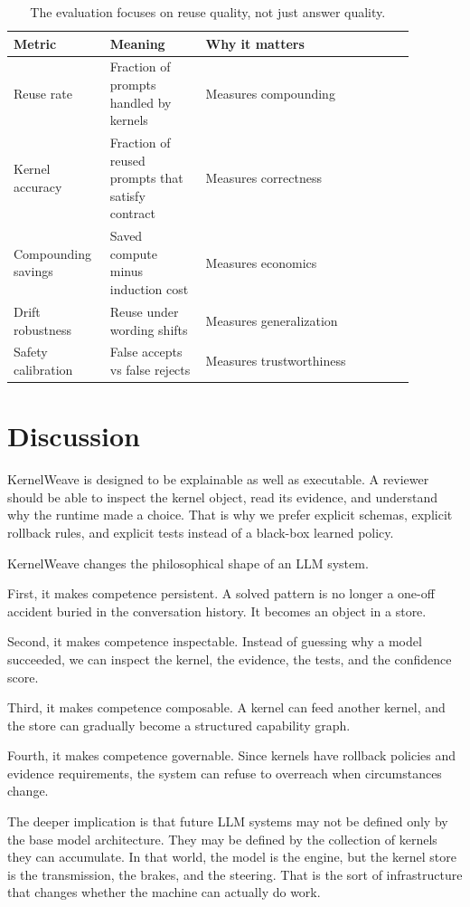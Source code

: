 \documentclass{article}
\begin{document}
\begin{table}[h]
\centering
\begin{tabular}{p{0.18\linewidth} p{0.22\linewidth} p{0.48\linewidth}}
\toprule
Metric & Meaning & Why it matters \\
\midrule
Reuse rate & Fraction of prompts handled by kernels & Measures compounding \\
Kernel accuracy & Fraction of reused prompts that satisfy contract & Measures correctness \\
Compounding savings & Saved compute minus induction cost & Measures economics \\
Drift robustness & Reuse under wording shifts & Measures generalization \\
Safety calibration & False accepts vs false rejects & Measures trustworthiness \\
\bottomrule
\end{tabular}
\caption{The evaluation focuses on reuse quality, not just answer quality.}
\end{table}

\section{Discussion}

KernelWeave is designed to be explainable as well as executable. A reviewer should be able to inspect the kernel object, read its evidence, and understand why the runtime made a choice. That is why we prefer explicit schemas, explicit rollback rules, and explicit tests instead of a black-box learned policy.

KernelWeave changes the philosophical shape of an LLM system.

First, it makes competence persistent. A solved pattern is no longer a one-off accident buried in the conversation history. It becomes an object in a store.

Second, it makes competence inspectable. Instead of guessing why a model succeeded, we can inspect the kernel, the evidence, the tests, and the confidence score.

Third, it makes competence composable. A kernel can feed another kernel, and the store can gradually become a structured capability graph.

Fourth, it makes competence governable. Since kernels have rollback policies and evidence requirements, the system can refuse to overreach when circumstances change.

The deeper implication is that future LLM systems may not be defined only by the base model architecture. They may be defined by the collection of kernels they can accumulate. In that world, the model is the engine, but the kernel store is the transmission, the brakes, and the steering. That is the sort of infrastructure that changes whether the machine can actually do work.
\end{document}
